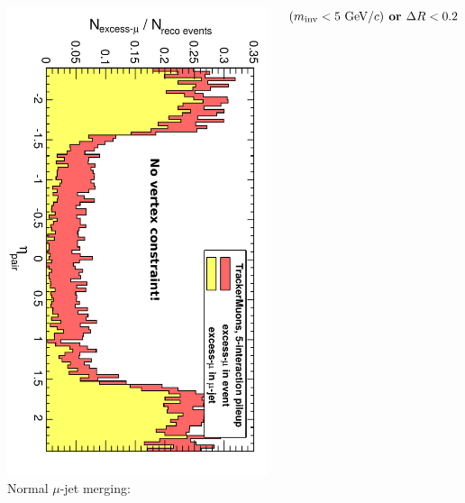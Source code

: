 \documentclass[compress]{beamer}
\begin{document}
\begin{frame}
\begin{columns}
\includegraphics[height=\linewidth, angle=90]{toomanymuons_TrackerMuonsGroupByDeltaROrMass_pileup5.pdf}
Normal $\mu$-jet merging:

$(m_{\mbox{\scriptsize inv}} < 5\mbox{ GeV/}c) \mbox{\bf\mbox{ or }} \Delta R < 0.2$
\end{columns}
\end{frame}
\end{document}
